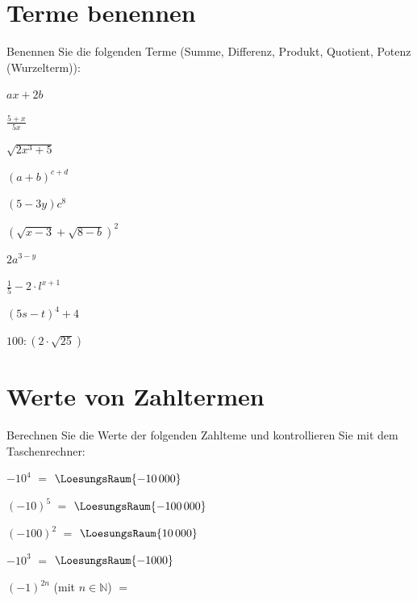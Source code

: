 
\renewcommand{\bbwAufgabenBlockID}{A1Te}

\renewcommand{\metaHeaderLine}{Aufgabenblatt}
\renewcommand{\arbeitsblattTitel}{Algebra: Terme}



\arbeitsblattHeader{}
\section{Terme benennen}
Benennen Sie die folgenden Terme (Summe, Differenz, Produkt, Quotient,
Potenz (Wurzelterm)):

\begin{bbwAufgabenBlock}
\item $ax+2b$ \, 
\item $\frac{5+x}{5x}$ \, 
\item $\sqrt{2x^3+5}$ \, 
\item $(a+b)^{c+d}$ \, 
\item $(5-3y)c^8$ \, 
\item $(\sqrt{x-3}+\sqrt{8-b})^2$ \, 
\item $2a^{3-y}$ \, \newpage
\item $\frac15 - 2\cdot{}l^{x+1}$ \, 
\item $(5s-t)^4+4$ \, 
\item $100:(2\cdot{}\sqrt{25})$ \, 
\end{bbwAufgabenBlock}

\newpage


\section{Werte von Zahltermen}
Berechnen Sie die Werte der folgenden Zahlteme und kontrollieren Sie
mit dem Taschenrechner:

\begin{bbwAufgabenBlock}
\item $-10^4$ $=$ $\LoesungsRaum{-10\,000}$
\item $(-10)^5$ $=$ $\LoesungsRaum{-100\,000}$
\item $(-100)^2$ $=$ $\LoesungsRaum{10\,000}$
\item $-10^3$ $=$ $\LoesungsRaum{-1000}$
\item $(-1)^{2n}$  (mit $n\in\mathbb{N}$)  $=$ 
\end{bbwAufgabenBlock}

